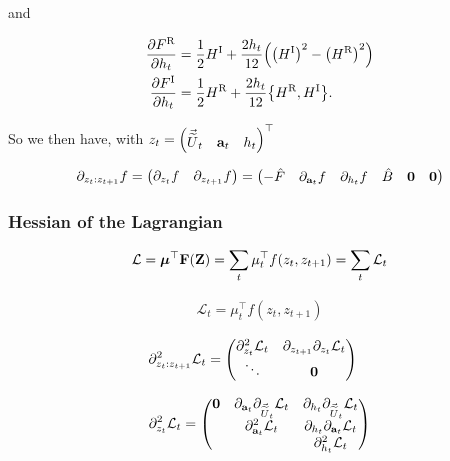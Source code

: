 \documentclass{article}
\newcommand{\isovecU}{\vec{\widetilde{U}}}
\newcommand{\HI}{H^{\text{I}}}
\newcommand{\HR}{H^{\text{R}}}
\newcommand{\FR}{F^{\text{R}}}
\newcommand{\FI}{F^{\text{I}}}
\begin{document}
and

\begin{align*}
  \pdv{\FR}{h_t} &= \frac{1}{2} \HI + \frac{2h_t}{12} \qty(\qty(\HI)^2 - \qty(\HR)^2) \\
  \pdv{\FI}{h_t} &= \frac{1}{2} \HR + \frac{2h_t}{12} \qty{\HR,\HI}.
\end{align*}

So we then have, with $z_t = \mqty(\isovecU_t & \vb{a}_t & h_t)^\top$

\begin{equation*}
  \partial_{z_t:z_{t+1}} f = \mqty(\partial_{z_t}f & \partial_{z_{t+1}}f) = \mqty(-\hat F & \partial_{\vb{a}_t}f & \partial_{h_t} f & \hat B & \vb{0} & \vb{0} )
\end{equation*}

\subsubsection*{Hessian of the Lagrangian}

\begin{align*}
  \mathcal{L} = \vb*{\mu}^\top \vb{F}(\vb{Z}) = \sum_t \mu_t^\top f(z_t, z_{t+1}) = \sum_t \mathcal{L}_t
\end{align*}

\begin{align*}
  \mathcal{L}_t = \mu_t^\top f(z_t, z_{t+1})
\end{align*}

\begin{align*}
  \partial^2_{z_t:z_{t+1}} \mathcal{L}_t 
  &= \mqty(
    \partial^2_{z_t} \mathcal{L}_t & \partial_{z_{t+1}} \partial_{z_t} \mathcal{L}_t \\
    \ddots & \vb{0}
  )
\end{align*}


\begin{align*}
  \partial^2_{z_t} \mathcal{L}_t = \mqty(
    \vb{0} & \partial_{\vb{a}_t} \partial_{\isovecU_t} \mathcal{L}_t & \partial_{h_t} \partial_{\isovecU_t} \mathcal{L}_t \\
    & \partial^2_{\vb{a}_t} \mathcal{L}_t & \partial_{h_t} \partial_{\vb{a}_t} \mathcal{L}_t \\
    & & \partial^2_{h_t} \mathcal{L}_t
  )
\end{align*}
\end{document}
